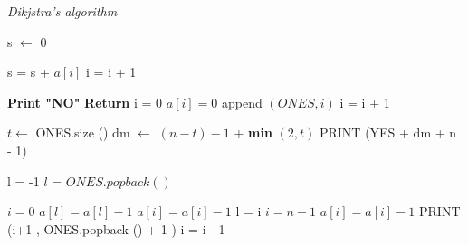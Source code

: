 \documentclass[10pt]{article}
\begin{document}
    \begin{algorithm}[H]
        \caption{\textit{Dikjstra's algorithm}}
        \begin{algorithmic}[1]      
        \State s $ \leftarrow$ 0 
        
                \State s = s + $a\left[i\right]$
                \State i = i + 1 
        \EndWhile 

            \State \textbf{Print "NO"}
            \State \textbf{Return}
        \EndIf
        \State i = 0 
                \State $a\left[i\right] = 0$
                \State append $\left(ONES , i  \right)$
                \State i = i + 1 
            \EndIf 
        \EndWhile

        \State $t\leftarrow $ ONES.size ()
        \State dm $\leftarrow$ $\left(n-t\right) - 1$ + \textbf{min} $\left(2,t\right)$
        \State PRINT (YES +  dm + n - 1) 

        \State l = -1 
            \State $l$ = $ONES.popback()$
        \EndIf
        
        \State $i = 0$
                    \State $a\left[l\right] = a\left[l\right]  -1  $
                    \State $a\left[i\right] = a\left[i\right]  -1  $
                \EndIf
                \State l = i 
            \EndIf
        \EndWhile
        \State $i = n-1$
                \State $a\left[i\right] = a\left[i\right] - 1 $
                \State PRINT (i+1 , ONES.popback () + 1 )
            \EndWhile
            \State i = i - 1 
        \EndWhile
        \end{algorithmic}
    \end{algorithm}
\end{document}
